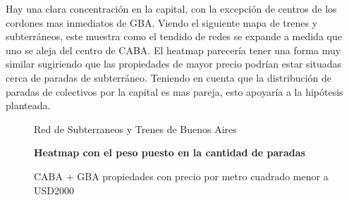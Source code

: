 \documentclass[a4paper, 10pt]{article}
\begin{document}
				Hay una clara concentración en la capital, con la excepción de centros de los cordones mas 
				inmediatos de GBA. Viendo el siguiente mapa de trenes y subterráneos, este muestra como 
				el tendido de redes se expande a medida que uno se aleja del centro de CABA. El heatmap 
				parecería tener una forma muy similar sugiriendo que las propiedades de mayor precio 
				podrían estar situadas cerca de paradas de subterráneo. Teniendo en cuenta que la 
				distribución de paradas de colectivos por la capital es mas pareja, esto apoyaría a 
				la hipótesis planteada.
				
				\begin{figure}
    				\centering
    				\caption{Red de Subterraneos y Trenes de Buenos Aires}
				\end{figure}
				\begin{figure}
    				\centering
    				\textbf{Heatmap con el peso puesto en la cantidad de paradas}\par\medskip
    				\caption{CABA + GBA propiedades con precio por metro cuadrado menor a \textdollar USD2000}
				\end{figure}
				\FloatBarrier
				
\end{document}

